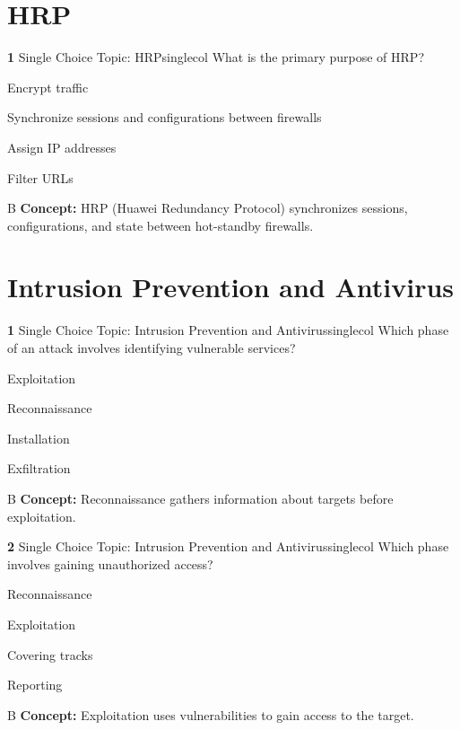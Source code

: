 \documentclass[10pt,a4paper]{article}
\begin{document}
\section{HRP}
\begin{qcard}{\color{white}\textbf{1} \hfill \small Single Choice \textbar{} Topic: HRP}{singlecol}
What is the primary purpose of HRP?

\begin{qoptions}
\item Encrypt traffic
\item Synchronize sessions and configurations between firewalls
\item Assign IP addresses
\item Filter URLs
\end{qoptions}
\begin{explainbox}{B}
\textbf{Concept:} HRP (Huawei Redundancy Protocol) synchronizes sessions, configurations, and state between hot-standby firewalls.
\end{explainbox}
\end{qcard}

\section{Intrusion Prevention and Antivirus}
\begin{qcard}{\color{white}\textbf{1} \hfill \small Single Choice \textbar{} Topic: Intrusion Prevention and Antivirus}{singlecol}
Which phase of an attack involves identifying vulnerable services?

\begin{qoptions}
\item Exploitation
\item Reconnaissance
\item Installation
\item Exfiltration
\end{qoptions}
\begin{explainbox}{B}
\textbf{Concept:} Reconnaissance gathers information about targets before exploitation.
\end{explainbox}
\end{qcard}

\begin{qcard}{\color{white}\textbf{2} \hfill \small Single Choice \textbar{} Topic: Intrusion Prevention and Antivirus}{singlecol}
Which phase involves gaining unauthorized access?

\begin{qoptions}
\item Reconnaissance
\item Exploitation
\item Covering tracks
\item Reporting
\end{qoptions}
\begin{explainbox}{B}
\textbf{Concept:} Exploitation uses vulnerabilities to gain access to the target.
\end{explainbox}
\end{qcard}
\end{document}
